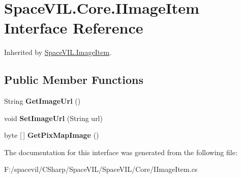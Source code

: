 \hypertarget{interface_space_v_i_l_1_1_core_1_1_i_image_item}{}\section{Space\+V\+I\+L.\+Core.\+I\+Image\+Item Interface Reference}
\label{interface_space_v_i_l_1_1_core_1_1_i_image_item}


Inherited by \mbox{\hyperlink{class_space_v_i_l_1_1_image_item}{Space\+V\+I\+L.\+Image\+Item}}.

\subsection*{Public Member Functions}
\begin{DoxyCompactItemize}
\item 
\mbox{\label{interface_space_v_i_l_1_1_core_1_1_i_image_item_ac4ff6be78c3285fd28b4b80549371a9d}} 
String {\bfseries Get\+Image\+Url} ()
\item 
\mbox{\label{interface_space_v_i_l_1_1_core_1_1_i_image_item_acd75a2df3853a0ab6b832e6c4f0b0527}} 
void {\bfseries Set\+Image\+Url} (String url)
\item 
\mbox{\label{interface_space_v_i_l_1_1_core_1_1_i_image_item_af144d0b9a1fdf87852354120c1843ad9}} 
byte \mbox{[}$\,$\mbox{]} {\bfseries Get\+Pix\+Map\+Image} ()
\end{DoxyCompactItemize}


The documentation for this interface was generated from the following file\+:\begin{DoxyCompactItemize}
\item 
F\+:/spacevil/\+C\+Sharp/\+Space\+V\+I\+L/\+Space\+V\+I\+L/\+Core/I\+Image\+Item.\+cs\end{DoxyCompactItemize}
